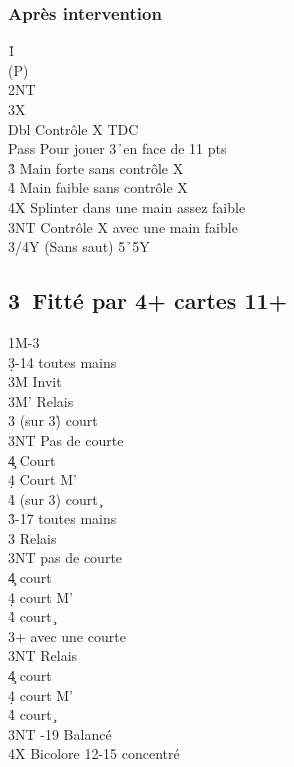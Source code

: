 \documentclass[a4paper]{article}
\begin{document}
\subsubsection{Après intervention}

\begin{bidtable}
1\h\+\\
(P)\+\\
2NT\+\\
3X\+\\
Dbl \> Contrôle X TDC\\
Pass \> Pour jouer 3\h\ en face de 11 pts\\
3\h \> Main forte sans contrôle X\\
4\h \> Main faible sans contrôle X\\
4X \> Splinter dans une main assez faible\\
3NT \> Contrôle X avec une main faible\\
3/4Y \> (Sans saut) 5\h\ 5Y\-\-\-\-
\end{bidtable}

\subsection{3\pdfc\ Fitté par 4+ cartes 11+}

\begin{bidtable}
1M-3\c\\
3\d {}-14 toutes mains\+\\
3M \> Invit\\
3M' \> Relais\+\\
3\s \> (sur 3\h ) court \c \\
3NT \> Pas de courte\\
4\c \> Court \d \\
4\d \> Court M'\\
4\h \> (sur 3\s ) court \c \-\-\\
3\h {}-17 toutes mains\+\\
3\s \> Relais\+\\
3NT \> pas de courte\\
4\c \> court \d \\
4\d \> court M'\\
4\h \> court \c \-\-\\
3\s {}+ avec une courte\+\\
3NT \> Relais\+\\
4\c \> court \d \\
4\d \> court M'\\
4\h \> court \c \-\-\\
3NT -19 Balancé\\
4X \> Bicolore 12-15 concentré
\end{bidtable}
\end{document}
